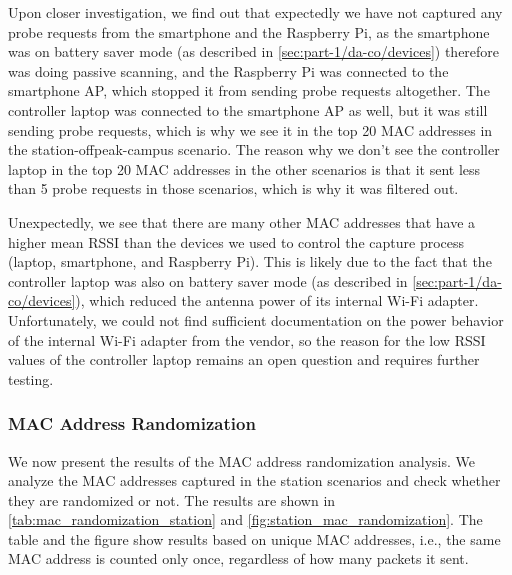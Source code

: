 \documentclass[sigconf,nonacm]{acmart}
\begin{document}
Upon closer investigation, we find out that expectedly we have not captured any probe requests from the smartphone and the Raspberry Pi, as the smartphone was on battery saver mode (as described in \cref{sec:part-1/da-co/devices}) therefore was doing passive scanning, and the Raspberry Pi was connected to the smartphone AP, which stopped it from sending probe requests altogether. The controller laptop was connected to the smartphone AP as well, but it was still sending probe requests, which is why we see it in the top 20 MAC addresses in the station-offpeak-campus scenario. The reason why we don't see the controller laptop in the top 20 MAC addresses in the other scenarios is that it sent less than 5 probe requests in those scenarios, which is why it was filtered out.

Unexpectedly, we see that there are many other MAC addresses that have a higher mean RSSI than the devices we used to control the capture process (laptop, smartphone, and Raspberry Pi). This is likely due to the fact that the controller laptop was also on battery saver mode (as described in \cref{sec:part-1/da-co/devices}), which reduced the antenna power of its internal Wi-Fi adapter. Unfortunately, we could not find sufficient documentation on the power behavior of the internal Wi-Fi adapter from the vendor, so the reason for the low RSSI values of the controller laptop remains an open question and requires further testing.

\subsubsection{MAC Address Randomization}
\label{sec:part-1/station/mac-randomization}

We now present the results of the MAC address randomization analysis. We analyze the MAC addresses captured in the station scenarios and check whether they are randomized or not. The results are shown in \cref{tab:mac_randomization_station} and \cref{fig:station_mac_randomization}. The table and the figure show results based on unique MAC addresses, i.e., the same MAC address is counted only once, regardless of how many packets it sent.

\begin{table}[ht]
    \centering
    \caption{MAC Address Randomization Ratios in Station Scenarios}
    \label{tab:mac_randomization_station}
\end{table}
\end{document}
